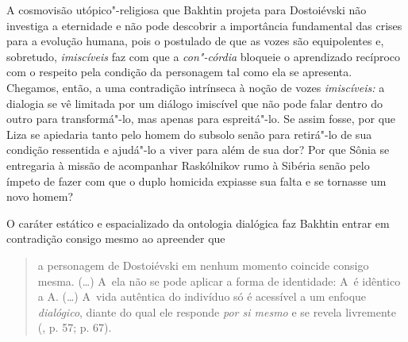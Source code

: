 A cosmovisão utópico"-religiosa que Bakhtin projeta para Dostoiévski não
investiga a eternidade e não pode descobrir a importância fundamental
das crises para a evolução humana, pois o postulado de que as vozes são
equipolentes e, sobretudo, \emph{imiscíveis} faz com que a
\emph{con"-córdia} bloqueie o aprendizado recíproco com o respeito pela
condição da personagem tal como ela se apresenta. Chegamos, então, a uma
contradição intrínseca à noção de vozes \emph{imiscíveis:} a dialogia se
vê limitada por um diálogo imiscível que não pode falar dentro do outro
para transformá"-lo, mas apenas para espreitá"-lo. Se assim fosse, por que
Liza se apiedaria tanto pelo homem do subsolo senão para retirá"-lo de
sua condição ressentida e ajudá"-lo a viver para além de sua dor? Por que
Sônia se entregaria à missão de acompanhar Raskólnikov rumo à Sibéria
senão pelo ímpeto de fazer com que o duplo homicida expiasse sua falta e
se tornasse um novo homem?

O caráter estático e espacializado da ontologia dialógica faz Bakhtin
entrar em contradição consigo mesmo ao apreender que

\begin{quote}
a personagem de Dostoiévski em nenhum momento coincide consigo mesma.
(\ldots) A~ela não se pode aplicar a forma de identidade: A~é idêntico a A.
(\ldots) A~vida autêntica do indivíduo só é acessível a um enfoque
\emph{dialógico}, diante do qual ele responde \emph{por si mesmo} e se
revela livremente (, p. 57; p. 67).
\end{quote}

